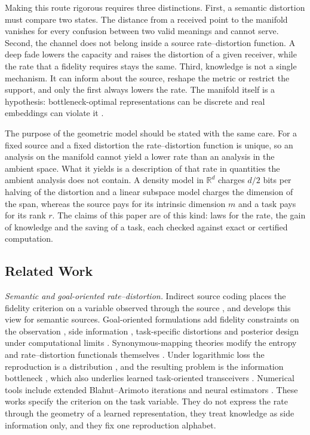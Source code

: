 \documentclass[10pt,journal]{IEEEtran}
\begin{document}
Making this route rigorous requires three distinctions. First, a semantic distortion must compare two states. The distance from a received point to the manifold vanishes for every confusion between two valid meanings and cannot serve. Second, the channel does not belong inside a source rate--distortion function. A deep fade lowers the capacity and raises the distortion of a given receiver, while the rate that a fidelity requires stays the same. Third, knowledge is not a single mechanism. It can inform about the source, reshape the metric or restrict the support, and only the first always lowers the rate. The manifold itself is a hypothesis: bottleneck-optimal representations can be discrete and real embeddings can violate it \cite{Robinson_2025}.

The purpose of the geometric model should be stated with the same care. For a fixed source and a fixed distortion the rate--distortion function is unique, so an analysis on the manifold cannot yield a lower rate than an analysis in the ambient space. What it yields is a description of that rate in quantities the ambient analysis does not contain. A density model in $\mathbb R^d$ charges $d/2$ bits per halving of the distortion and a linear subspace model charges the dimension of the span, whereas the source pays for its intrinsic dimension $m$ and a task pays for its rank $r$. The claims of this paper are of this kind: laws for the rate, the gain of knowledge and the saving of a task, each checked against exact or certified computation.

\subsection{Related Work}
\emph{Semantic and goal-oriented rate--distortion.} Indirect source coding places the fidelity criterion on a variable observed through the source \cite{dobrushin1962information,wolf1970transmission,witsenhausen1980indirect}, and \cite{liu2022indirect} develops this view for semantic sources. Goal-oriented formulations add fidelity constraints on the observation \cite{Stavrou_2023}, side information \cite{Guo_2026}, task-specific distortions \cite{Chai_2025} and posterior design under computational limits \cite{akyol2026semanticratedistortionposterior}. Synonymous-mapping theories modify the entropy and rate--distortion functionals themselves \cite{niu2024mathematical,zhao2025semanticrd}. Under logarithmic loss the reproduction is a distribution \cite{courtade2014multiterminal,yadav2026loglikelihoodlosssemanticcompression}, and the resulting problem is the information bottleneck \cite{tishby1999information,harremoes2007information,armstrong2026sourcesidesufficiencyinformationbottleneck}, which also underlies learned task-oriented transceivers \cite{shao2022taskoriented,xie2021deepsc,bourtsoulatze2019deep,gunduz2023beyond}. Numerical tools include extended Blahut--Arimoto iterations \cite{Han_2025} and neural estimators \cite{li2024fundamental,yang_sandwich}. These works specify the criterion on the task variable. They do not express the rate through the geometry of a learned representation, they treat knowledge as side information only, and they fix one reproduction alphabet.
\end{document}
